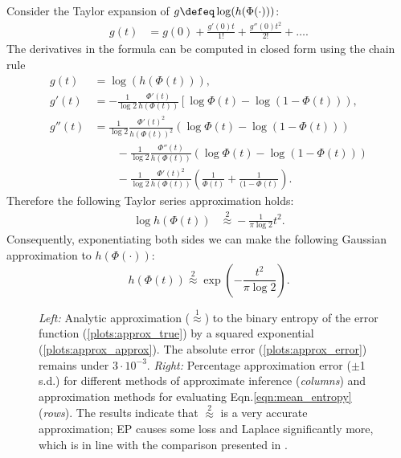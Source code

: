 Consider the Taylor expansion of $g \defeq \log(h(\Phi(\cdot)))$:
%
\begin{align}
	g(t) &= g(0) + \frac{g'(0)t}{1!} + \frac{g''(0)t^2}{2!} + \dots.
\end{align}
%
The derivatives in the formula can be computed in closed form using the chain rule
%
\begin{align}
	g(t) &= \log(h(\Phi(t))),\\
	g'(t) &= -\frac{1}{\log 2}\frac{\Phi'(t)}{h(\Phi(t))}\left[\log\Phi(t) - \log(1-\Phi(t))  \right), \\ 
	g''(t) &= \frac{1}{\log 2}\frac{\Phi'(t)^2}{h(\Phi(t))^2}\left(\log\Phi(t) - \log(1-\Phi(t))  \right)\\
	& \qquad - \frac{1}{\log 2}\frac{\Phi''(t)}{h(\Phi(t))}\left(\log\Phi(t) - \log(1-\Phi(t))  \right) \\
	& \qquad - \frac{1}{\log 2}\frac{\Phi'(t)^2}{h(\Phi(t))}\left(\frac{1}{\Phi(t)} + \frac{1}{(1-\Phi(t)}  \right).
\end{align}
%
Therefore the following Taylor series approximation holds:
%
\begin{align}
	\log h(\Phi(t)) &\stackrel{2}{\approx} - \frac{1}{\pi\log 2}t^2.
\end{align}
%
Consequently, exponentiating both sides we can make the following Gaussian approximation to $h(\Phi(\cdot))$:
%
\begin{equation}
	h(\Phi(t))\stackrel{2}{\approx}\exp\left({-\frac{t^2}{\pi\log 2}}\right).
\end{equation}

\begin{figure}
	\centering

	\caption[Taylor series approximation to the value of information in GP classification]{\emph{Left:} Analytic approximation ({\scriptsize $\stackrel{1}{\approx}$}) to the binary entropy of the error function (\ref{plots:approx_true}) by a squared exponential (\ref{plots:approx_approx}). The absolute error (\ref{plots:approx_error}) remains under $3\cdot 10^{-3}$. \emph{Right:} Percentage approximation error ($\pm$1 s.d.) for different methods of approximate inference (\emph{columns}) and approximation methods for evaluating Eqn.\eqref{eqn:mean_entropy} (\emph{rows}). The results indicate that {\scriptsize $\stackrel{2}{\approx}$} is a very accurate approximation; EP causes some loss and Laplace significantly more, which is in line with the comparison presented in \citep{Kuss2005}. }\label{fig:trick}
\end{figure}


